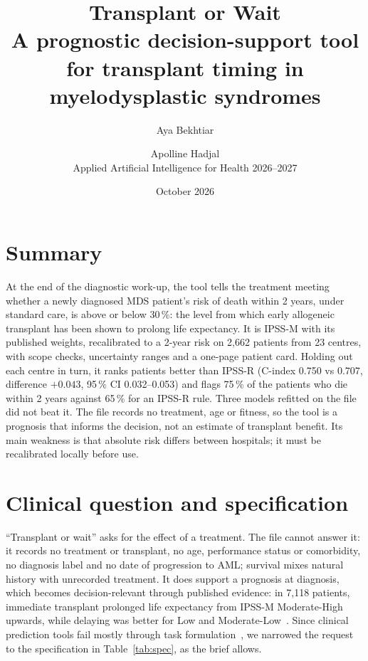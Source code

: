 \documentclass[11pt,a4paper]{article}
\title{\vspace{-1.5cm}\textbf{Transplant or Wait}\\[0.3em]
\large A prognostic decision-support tool for transplant timing in myelodysplastic syndromes}
\author{Aya Bekhtiar \and Apolline Hadjal\\[0.2em]
\small Applied Artificial Intelligence for Health 2026--2027}
\date{October 2026}
\begin{document}
\maketitle
\vspace{-0.8cm}

\section*{Summary}
At the end of the diagnostic work-up, the tool tells the treatment meeting whether a newly diagnosed MDS patient's risk of death within 2 years, under standard care, is above or below 30\,\%: the level from which early allogeneic transplant has been shown to prolong life expectancy. It is IPSS-M with its published weights, recalibrated to a 2-year risk on 2{,}662 patients from 23 centres, with scope checks, uncertainty ranges and a one-page patient card. Holding out each centre in turn, it ranks patients better than IPSS-R (C-index 0.750 vs 0.707, difference $+0.043$, 95\,\% CI 0.032--0.053) and flags 75\,\% of the patients who die within 2 years against 65\,\% for an IPSS-R rule. Three models refitted on the file did not beat it. The file records no treatment, age or fitness, so the tool is a prognosis that informs the decision, not an estimate of transplant benefit. Its main weakness is that absolute risk differs between hospitals; it must be recalibrated locally before use.

\section{Clinical question and specification}
``Transplant or wait'' asks for the effect of a treatment. The file cannot answer it: it records no treatment or transplant, no age, performance status or comorbidity, no diagnosis label and no date of progression to AML; survival mixes natural history with unrecorded treatment. It does support a prognosis at diagnosis, which becomes decision-relevant through published evidence: in 7{,}118 patients, immediate transplant prolonged life expectancy from IPSS-M Moderate-High upwards, while delaying was better for Low and Moderate-Low~\cite{tentori}. Since clinical prediction tools fail mostly through task formulation~\cite{wiens}, we narrowed the request to the specification in Table~\ref{tab:spec}, as the brief allows.
\end{document}
